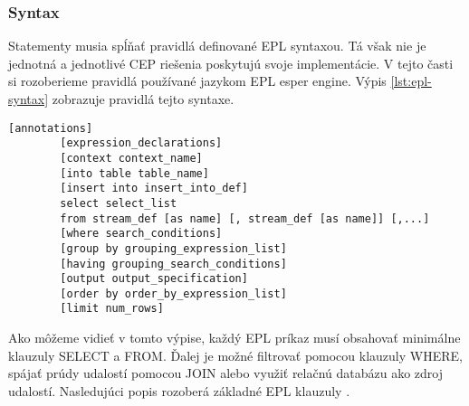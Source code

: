 		\subsubsection{Syntax}
		Statementy musia spĺňať pravidlá definované EPL syntaxou. Tá však nie je jednotná a jednotlivé CEP riešenia poskytujú svoje implementácie. V tejto časti si rozoberieme pravidlá používané jazykom EPL esper engine. Výpis \ref{lst:epl-syntax} zobrazuje pravidlá tejto syntaxe.
		
		\begin{lstlisting}[label=lst:epl-syntax,caption=Vzor EPL syntaxe]
		[annotations]
		[expression_declarations]
		[context context_name]
		[into table table_name]
		[insert into insert_into_def]
		select select_list
		from stream_def [as name] [, stream_def [as name]] [,...]
		[where search_conditions]
		[group by grouping_expression_list]
		[having grouping_search_conditions]
		[output output_specification]
		[order by order_by_expression_list]
		[limit num_rows]
		\end{lstlisting}

		Ako môžeme vidieť v tomto výpise, každý EPL príkaz musí obsahovať minimálne klauzuly SELECT a FROM. Ďalej je možné filtrovať pomocou klauzuly WHERE, spájať prúdy udalostí pomocou JOIN alebo využiť relačnú databázu ako zdroj udalostí. Nasledujúci popis rozoberá základné EPL klauzuly \cite{web:esper-doc}.
		
